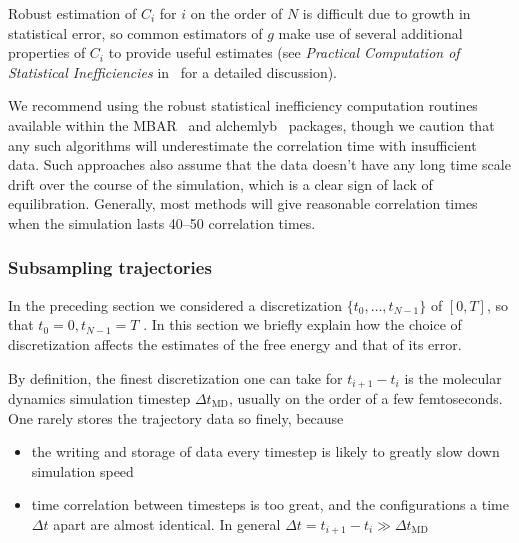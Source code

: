 \documentclass[9pt,bestpractices]{livecoms}
\begin{document}
Robust estimation of $C_i$ for $i$ on the order of $N$ is difficult due to growth in statistical error, so common estimators of $g$ make use of several additional properties of $C_i$ to provide useful estimates (see \emph{Practical Computation of Statistical Inefficiencies} in~\cite{chodera2016simple} for a detailed discussion).

We recommend using the robust statistical inefficiency computation routines available within the MBAR~\cite{kylebeauchamp2019choderalab} and alchemlyb~\cite{daviddotson2019alchemistry} packages, though we caution that any such algorithms will underestimate the correlation time with insufficient data. Such approaches also assume that the data doesn't have any long time scale drift over the course of the simulation, which is a clear sign of lack of equilibration.  Generally, most methods will give reasonable correlation times when the simulation lasts 40--50 correlation times.


\subsubsection{Subsampling trajectories}
\label{sec:subsampling}

In the preceding section we considered a discretization   $\{t_0, \dots, t_{N-1}\}$ of $[0,T]$, so that $t_0=0, t_{N-1}=T$ . In this section we briefly explain how the choice of discretization affects the estimates of the free energy and that of its error. 

By definition, the finest discretization one can take for $t_{i+1} - t_i$ is the molecular dynamics simulation timestep $\Delta t_{\mathrm{MD}}$, usually on the order of a few femtoseconds. One rarely stores the trajectory data so finely, because 
\begin{itemize}
    \item the writing and storage of data every timestep is likely to greatly slow down simulation speed
    \item time correlation between timesteps is too great, and the configurations a time $\Delta t$ apart are almost identical. In general $\Delta t = t_{i+1} - t_i \gg \Delta t_{\mathrm{MD}}$
\end{itemize}
\end{document}
